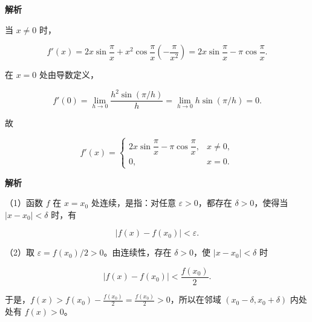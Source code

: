 \begin{answer}
\textbf{解析}

当 $x\ne0$ 时，

\nopagebreak[4]
\[
f'(x)=2x\sin\frac\pi x+x^2\cos\frac\pi x\left(-\frac\pi{x^2}\right)
=2x\sin\frac\pi x-\pi\cos\frac\pi x.
\]

在 $x=0$ 处由导数定义，

\nopagebreak[4]
\[
f'(0)=\lim_{h\to0}\frac{h^2\sin(\pi/h)}h
=\lim_{h\to0}h\sin(\pi/h)=0.
\]

故

\nopagebreak[4]
\[
f'(x)=
\begin{cases}
2x\sin\dfrac\pi x-\pi\cos\dfrac\pi x,&x\ne0,\\
0,&x=0.
\end{cases}
\]


\textbf{解析}

（1）函数 $f$ 在 $x=x_0$ 处连续，是指：对任意 $\varepsilon>0$，都存在 $\delta>0$，使得当 $|x-x_0|<\delta$ 时，有

\nopagebreak[4]
\[
|f(x)-f(x_0)|<\varepsilon.
\]

（2）取 $\varepsilon=f(x_0)/2>0$。由连续性，存在 $\delta>0$，使 $|x-x_0|<\delta$ 时

\nopagebreak[4]
\[
|f(x)-f(x_0)|<\frac{f(x_0)}2.
\]

于是，$f(x)>f(x_0)-\frac{f(x_0)}2=\frac{f(x_0)}2>0$，所以在邻域
$(x_0-\delta,x_0+\delta)$ 内处处有 $f(x)>0$。


\end{answer}